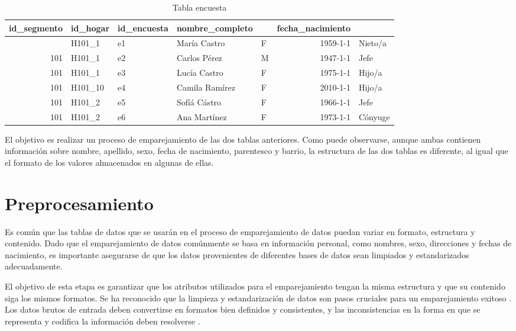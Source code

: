 \documentclass[
  12pt,
]{book}
\begin{document}
\begin{table}[t]
\caption*{
{\large Tabla encuesta}
} 
\fontsize{12.0pt}{14.4pt}\selectfont
\begin{tabular*}{\linewidth}{@{\extracolsep{\fill}}rllllrl}
\toprule
id\_segmento & id\_hogar & id\_encuesta & nombre\_completo & {\bfseries \cellcolor[HTML]{F9F9F9}{sexo}} & fecha\_nacimiento & {\bfseries \cellcolor[HTML]{F9F9F9}{parentesco}} \\ 
\midrule\addlinespace[2.5pt]
101 & H101\_1 & e1 & María Castro & F & 1959-1-1 & Nieto/a \\ 
101 & H101\_1 & e2 & Carlos Pérez & M & 1947-1-1 & Jefe \\ 
101 & H101\_1 & e3 & Lucía Castro & F & 1975-1-1 & Hijo/a \\ 
101 & H101\_10 & e4 & Camila Ramírez & F & 2010-1-1 & Hijo/a \\ 
101 & H101\_2 & e5 & Sofíá Cástro & F & 1966-1-1 & Jefe \\ 
101 & H101\_2 & e6 & Ana Martínez & F & 1973-1-1 & Cónyuge \\ 
\bottomrule
\end{tabular*}
\end{table}

El objetivo es realizar un proceso de emparejamiento de las dos tablas anteriores. Como puede observarse, aunque ambas contienen información sobre nombre, apellido, sexo, fecha de nacimiento, parentesco y barrio, la estructura de las dos tablas es diferente, al igual que el formato de los valores almacenados en algunas de ellas.

\section{Preprocesamiento}\label{preprocesamiento}

Es común que las tablas de datos que se usarán en el proceso de emparejamiento de datos puedan variar en formato, estructura y contenido. Dado que el emparejamiento de datos comúnmente se basa en información personal, como nombres, sexo, direcciones y fechas de nacimiento, es importante asegurarse de que los datos provenientes de diferentes bases de datos sean limpiados y estandarizados adecuadamente.

El objetivo de esta etapa es garantizar que los atributos utilizados para el emparejamiento tengan la misma estructura y que su contenido siga los mismos formatos. Se ha reconocido que la limpieza y estandarización de datos son pasos cruciales para un emparejamiento exitoso \citep{herzog2007data}. Los datos brutos de entrada deben convertirse en formatos bien definidos y consistentes, y las inconsistencias en la forma en que se representa y codifica la información deben resolverse \citep{churches2002preparation}.
\end{document}
